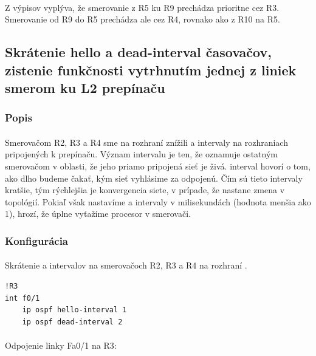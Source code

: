 \documentclass[12pt,twoside,a4paper]{report}
\begin{document}
\paragraph{}
Z výpisov vyplýva, že smerovanie z R5 ku R9 prechádza prioritne cez R3. Smerovanie od R9 do R5 prechádza ale cez R4, rovnako ako z R10 na R5.


\subsection{Skrátenie hello a dead-interval časovačov, zistenie funkčnosti vytrhnutím jednej z liniek smerom ku L2 prepínaču}

\subsubsection{Popis}
\paragraph{}
Smerovačom R2, R3 a R4 sme na rozhraní  znížili  a  intervaly na rozhraniach pripojených k prepínaču. Význam  intervalu je ten, že oznamuje ostatným smerovačom v oblasti, že jeho priamo pripojená sieť je živá.  interval hovorí o tom, ako dlho budeme čakať, kým sieť vyhlásime za odpojenú. Čím sú tieto intervaly kratšie, tým rýchlejšia je konvergencia siete, v prípade, že nastane zmena v topológií. Pokiaľ však nastavíme  a  intervaly v milisekundách (hodnota menšia ako 1), hrozí, že úplne vyťažíme procesor v smerovači.

\subsubsection{Konfigurácia}
\paragraph{}
Skrátenie  a  intervalov na smerovačoch R2, R3 a R4 na rozhraní .

\noindent
{\selectfont
\begin{small}
\begin{verbatim}
!R3
int f0/1
    ip ospf hello-interval 1
    ip ospf dead-interval 2

\end{verbatim}
\end{small}
}

\paragraph{}
Odpojenie linky Fa0/1 na R3:
\end{document}
